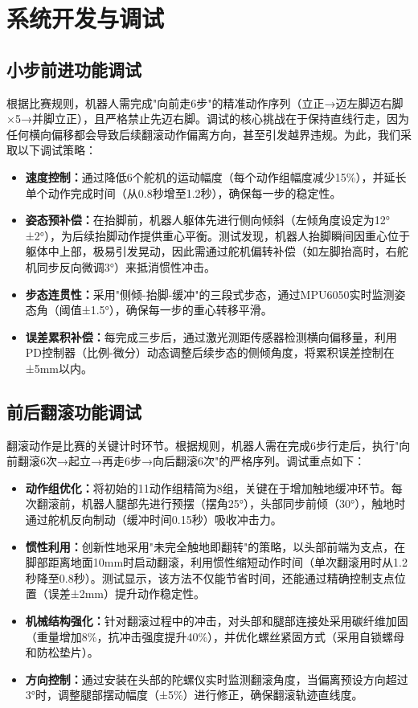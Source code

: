 \documentclass[a4paper,fontset=windows]{ctexart}
\providecommand{\tightlist}{%
  \setlength{\itemsep}{0pt}\setlength{\parskip}{0pt}}
\begin{document}
\section{系统开发与调试}
\subsection{小步前进功能调试}
根据比赛规则，机器人需完成"向前走6步"的精准动作序列（立正→迈左脚迈右脚×5→并脚立正），且严格禁止先迈右脚。调试的核心挑战在于保持直线行走，因为任何横向偏移都会导致后续翻滚动作偏离方向，甚至引发越界违规。为此，我们采取以下调试策略：
\begin{itemize}
    \tightlist
    \item \textbf{速度控制：}通过降低6个舵机的运动幅度（每个动作组幅度减少15\%），并延长单个动作完成时间（从0.8秒增至1.2秒），确保每一步的稳定性。
    \item \textbf{姿态预补偿：}在抬脚前，机器人躯体先进行侧向倾斜（左倾角度设定为12°±2°），为后续抬脚动作提供重心平衡。测试发现，机器人抬脚瞬间因重心位于躯体中上部，极易引发晃动，因此需通过舵机偏转补偿（如左脚抬高时，右舵机同步反向微调3°）来抵消惯性冲击。
    \item \textbf{步态连贯性：}采用"侧倾-抬脚-缓冲"的三段式步态，通过MPU6050实时监测姿态角（阈值±1.5°），确保每一步的重心转移平滑。
    \item \textbf{误差累积补偿：}每完成三步后，通过激光测距传感器检测横向偏移量，利用PD控制器（比例-微分）动态调整后续步态的侧倾角度，将累积误差控制在±5mm以内。
\end{itemize}
\subsection{前后翻滚功能调试}
翻滚动作是比赛的关键计时环节。根据规则，机器人需在完成6步行走后，执行"向前翻滚6次→起立→再走6步→向后翻滚6次"的严格序列。调试重点如下：
\begin{itemize}
    \tightlist
    \item \textbf{动作组优化：}将初始的11动作组精简为8组，关键在于增加触地缓冲环节。每次翻滚前，机器人腿部先进行预摆（摆角25°），头部同步前倾（30°），触地时通过舵机反向制动（缓冲时间0.15秒）吸收冲击力。
    \item \textbf{惯性利用：}创新性地采用"未完全触地即翻转"的策略，以头部前端为支点，在脚部距离地面10mm时启动翻滚，利用惯性缩短动作时间（单次翻滚用时从1.2秒降至0.8秒）。测试显示，该方法不仅能节省时间，还能通过精确控制支点位置（误差±2mm）提升动作稳定性。
    \item \textbf{机械结构强化：}针对翻滚过程中的冲击，对头部和腿部连接处采用碳纤维加固（重量增加8\%，抗冲击强度提升40\%），并优化螺丝紧固方式（采用自锁螺母和防松垫片）。
    \item \textbf{方向控制：}通过安装在头部的陀螺仪实时监测翻滚角度，当偏离预设方向超过3°时，调整腿部摆动幅度（±5\%）进行修正，确保翻滚轨迹直线度。
\end{itemize}
\end{document}
